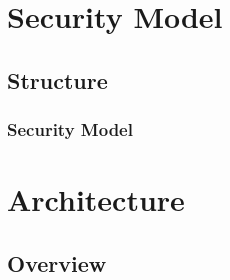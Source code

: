 \documentclass{beamer}
\begin{document}
\section{Security Model}
\subsection{Structure}
\begin{frame}
	\frametitle{Security Model}
\end{frame}

\section{Architecture}
\subsection{Overview}
\end{document}

